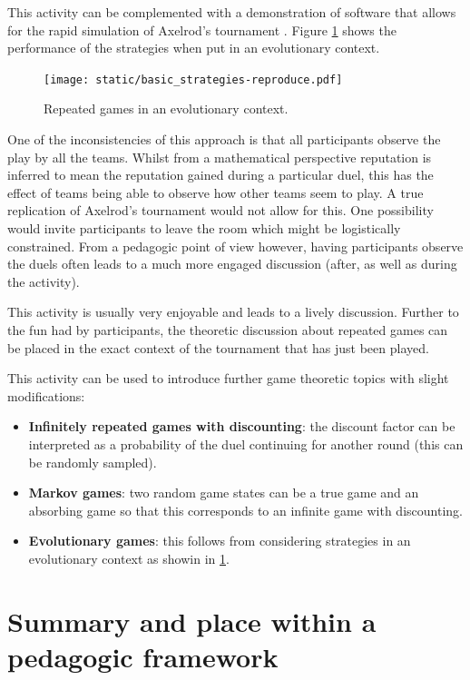 \documentclass[12pt, a4paper]{article}
\begin{document}
This activity can be complemented with a demonstration of software that allows
for the rapid simulation of Axelrod's tournament
\cite{Axelrod-Pythonprojectteam2015}. Figure \ref{fig:evolutionary_axelrod}
shows the performance of the strategies when put in an evolutionary context.

\begin{figure}[!hbtp]
    \centering
    \texttt{[image: static/basic\_strategies-reproduce.pdf]}
    \caption{Repeated games in an evolutionary context.}
    \label{fig:evolutionary_axelrod}
\end{figure}

One of the inconsistencies of this approach is that all participants observe the
play by all the teams. Whilst from a mathematical perspective reputation is
inferred to mean the reputation gained during a particular duel, this has the
effect of teams being able to observe how other teams seem to play. A true
replication of Axelrod's tournament would not allow for this. One possibility
would invite participants to leave the room which might be logistically
constrained. From a pedagogic point of view however, having participants observe
the duels often leads to a much more engaged discussion (after, as well as during
the activity).

This activity is usually very enjoyable and leads to a lively discussion.
Further to the fun had by participants, the theoretic discussion about repeated
games can be placed in the exact context of the tournament that has just been
played.

This activity can be used to introduce further game theoretic topics with
slight modifications:

\begin{itemize}
    \item \textbf{Infinitely repeated games with discounting}: the discount
        factor can be interpreted as a probability of the duel continuing for
        another round (this can be randomly sampled).
    \item \textbf{Markov games}: two random game states can be a true game
        and an absorbing game so that this corresponds to an infinite game with
        discounting.
    \item \textbf{Evolutionary games}: this follows from considering strategies
        in an evolutionary context as showin in \ref{fig:evolutionary_axelrod}.
\end{itemize}

\section{Summary and place within a pedagogic framework}\label{sec:summary}
\end{document}
